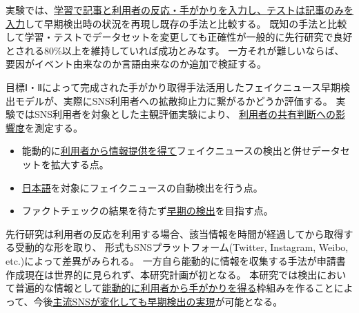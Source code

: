 実験では、\underline{学習で記事と利用者の反応・手がかりを入力し、テストは記事のみを入力}して早期検出時の状況を再現し既存の手法と比較する。
既知の手法と比較して学習・テストでデータセットを変更しても正確性が一般的に先行研究で良好とされる80\%以上を維持していれば成功とみなす。
一方それが難しいならば、要因がイベント由来なのか言語由来なのか追加で検証する。




目標Ⅰ・Ⅱによって完成された手がかり取得手法活用したフェイクニュース早期検出モデルが、実際にSNS利用者への拡散抑止力に繋がるかどうか評価する。
実験ではSNS利用者を対象とした主観評価実験により、
\underline{利用者の共有判断への影響度}を測定する。


\vspace{20pt}
\begin{itemize}
    \setlength{\parskip}{0cm}
    \setlength{\itemsep}{0cm}
    \item 能動的に\underline{利用者から情報提供を得て}フェイクニュースの検出と併せデータセットを拡大する点。
    \item \underline{日本語}を対象にフェイクニュースの自動検出を行う点。
    \item ファクトチェックの結果を待たず\underline{早期の検出}を目指す点。
\end{itemize}
\vspace{-10pt}
先行研究は利用者の反応を利用する場合、該当情報を時間が経過してから取得する受動的な形を取り、
形式もSNSプラットフォーム(Twitter, Instagram, Weibo, etc.)によって差異がみられる。
一方自ら能動的に情報を収集する手法が申請書作成現在は世界的に見られず、本研究計画が初となる。
本研究では検出において普遍的な情報として\underline{能動的に利用者から手がかりを得る}枠組みを作ることによって、今後\underline{主流SNSが変化しても早期検出の実現}が可能となる。

